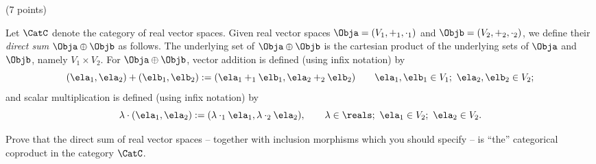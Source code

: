 \documentclass[paper=8.125in:10.250in,pagesize=pdftex,
    headinclude=false,footinclude=false,oneside,egregdoesnotlikesansseriftitles]{kaobook}
\begin{document}
\begin{gradedexercise}\label{ex:DirectSumCopr} (7 points) 


Let $\CatC$ denote the category of real vector spaces. Given real vector spaces $\Obja = (V_1, +_1, \cdot_1)$ and $\Objb = (V_2, +_2, \cdot_2)$, we define their \emph{direct sum} $\Obja \oplus \Objb$ as follows. 
The underlying set of $\Obja \oplus \Objb$ is the cartesian product of the underlying sets of $\Obja$ and $\Objb$, namely $V_1 \times V_2$. For $\Obja \oplus \Objb$, vector addition is defined (using infix notation) by
$$(\ela_1, \ela_2) + (\elb_1, \elb_2) := (\ela_1 +_1 \elb_1, \ela_2 +_2 \elb_2) \quad \quad \ela_1, \elb_1 \in V_1; \ \ela_2, \elb_2 \in V_2;$$
and scalar multiplication is defined (using infix notation) by
$$\lambda \cdot (\ela_1, \ela_2) := (\lambda \cdot_1 \ela_1, \lambda \cdot_2 \ela_2), \quad \quad \lambda \in \reals; \ \ela_1 \in V_2; \ \ela_2 \in V_2.$$

Prove that the direct sum of real vector spaces -- together with inclusion morphisms which you should specify -- is ``the'' categorical coproduct in the category $\CatC$. 
\end{gradedexercise}


\newpage
\end{document}
